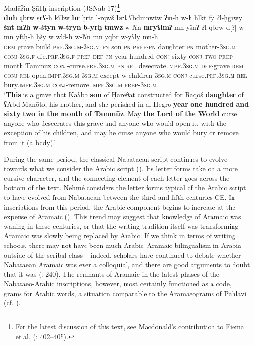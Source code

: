 \documentclass[output=paper]{langsci/langscibook}
\begin{document}
\ea Madāʔin Ṣāliḥ inscription (JSNab 17)\footnote{For the latest discussion of this text, see Macdonald’s contribution to Fiema et al. (\citeyear{Fiemaetal2015}: 402--405).}\label{Raqosh}\\ 
\gll   \textbf{dnh} qbrw ṣnʕ-h kʕbw \textbf{br} ḥrtt l-rqwš \textbf{brt} ʕbdmnwtw ʔm-h w-h hlkt fy ʔl-ḥgrwy \textbf{šnt} \textbf{mʔh} \textbf{w-štyn} \textbf{w-tryn} \textbf{b-yrḥ} \textbf{tmwz} w-lʕn \textbf{mryʕlmʔ} mn yšnʔ ʔl-qbrw d[ʔ] 	w-mn 		yftḥ-h ḥšy w wld-h w-lʕn mn yqbr w-{y}ʕly mn-h \\
       \textsc{dem} grave build.\textsc{prf.3sg.m-3sg.m} \textsc{pn} son \textsc{pn} \textsc{prep-pn} daughter \textsc{pn} mother-\textsc{3sg.m} \textsc{conj-3sg.f} die.\textsc{prf.3sg.f} \textsc{prep} \textsc{def-pn} year hundred \textsc{conj}-sixty \textsc{conj-two} \textsc{prep}-month Tammūz \textsc{conj}-curse.\textsc{prf.3sg.m} \textsc{pn} \textsc{rel} desecrate.\textsc{impf.3sg.m} \textsc{def}-grave \textsc{dem} \textsc{conj-rel} open.\textsc{impf.3sg.m-3sg.m} except w children-\textsc{3sg.m} \textsc{conj}-curse.\textsc{prf.3sg.m} \textsc{rel} bury.\textsc{impf.3sg.m} \textsc{conj}-remove.\textsc{impf.3sg.m} \textsc{prep-3sg.m} \\
\glt   `\textbf{This} is a grave that Kaʕbo \textbf{son} of Ḥāreθat constructed for Raqōś \textbf{daughter} of ʕAbd-Manōto, his mother, and she perished in al-Ḥegro \textbf{year one hundred and sixty two in the month of Tammūz}. May \textbf{the Lord of the World}  curse anyone who desecrates this grave and anyone who would open it, with the exception of his children, and may he curse anyone who would bury or remove from it (a body).'\\
\z

During the same period, the classical Nabataean script continues to evolve towards what we consider the Arabic script (\citealt{Nehmé2010}). Its letter forms take on a more cursive character, and the connecting element of each letter goes across the bottom of the text. Nehmé considers the letter forms typical of the Arabic script to have evolved from Nabataean between the third and fifth centuries CE. In inscriptions from this period, the Arabic component begins to increase at the expense of Aramaic (\citealt{Nehmé2017}). This trend may suggest that knowledge of Aramaic was waning in these centuries, or that the writing tradition itself was transforming – Aramaic was slowly being replaced by Arabic. If we think in terms of writing schools, there may not have been much Arabic--Aramaic bilingualism in Arabia outside of the scribal class – indeed, scholars have continued to debate whether Nabataean Aramaic was ever a colloquial, and there are good arguments to doubt that it was (\citealt{Gzella2015}: 240). The remnants of Aramaic in the latest phases of the Nabataeo-Arabic inscriptions, however, most certainly functioned as a code, grams for Arabic words, a situation comparable to the Aramaeograms of Pahlavi (cf. \citealt{Nyberg1974}).
\end{document}
